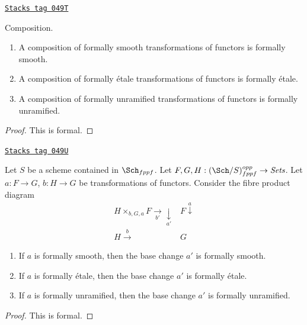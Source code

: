 \begin{lemma}
\label{spaces-more-morphisms-lemma-composition-formally-smooth-etale-unramified}
\href{https://stacks.math.columbia.edu/tag/049T}{\texttt{Stacks tag 049T}}

Composition.
\begin{enumerate}
\item A composition of formally smooth transformations of functors is formally
smooth.
\item A composition of formally \'etale transformations of functors is formally
\'etale.
\item A composition of formally unramified transformations of functors is
formally unramified.
\end{enumerate}
\end{lemma}

\begin{proof}
This is formal.
\end{proof}

\begin{lemma}
\label{spaces-more-morphisms-lemma-base-change-formally-smooth-etale-unramified}
\href{https://stacks.math.columbia.edu/tag/049U}{\texttt{Stacks tag 049U}}

Let $S$ be a scheme contained in $\Sch_{fppf}$.
Let $F, G, H : (\Sch/S)_{fppf}^{opp} \to \textit{Sets}$.
Let $a : F \to G$, $b : H \to G$ be transformations of functors.
Consider the fibre product diagram
$$
\begin{array}{cc}H \times_{b, G, a} F \underset{b'}{\longrightarrow}\underset{a'}{\downarrow} & F \overset{a}{\downarrow} \\ H \overset{b}{\longrightarrow} & G\end{array}
$$
\begin{enumerate}
\item If $a$ is formally smooth, then the base change $a'$ is
formally smooth.
\item If $a$ is formally \'etale, then the base change $a'$ is
formally \'etale.
\item If $a$ is formally unramified, then the base change $a'$ is
formally unramified.
\end{enumerate}
\end{lemma}

\begin{proof}
This is formal.
\end{proof}


